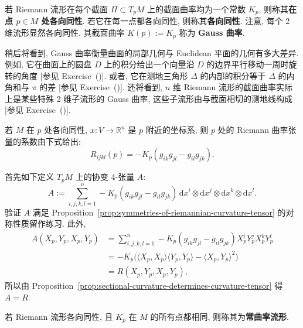 若 Riemann 流形在每个截面 $\Pi\subset T_pM$ 上的截面曲率均为一个常数 $K_p$, 则称其\textbf{在点 $p\in M$ 处各向同性}. 若它在每一点都各向同性, 则称其\textbf{各向同性}. 注意, 每个 2 维流形显然各向同性. 其截面曲率 $K(p):=K_p$ 称为 \textbf{Gauss 曲率}.

\begin{RiemannRemark}\label{rem:geometric-interpretations-of-gauss-curvature}
稍后将看到, Gauss 曲率衡量曲面的局部几何与 Euclidean 平面的几何有多大差异. 例如, 它在曲面上的圆盘 $D$ 上的积分给出一个向量沿 $D$ 的边界平行移动一周时旋转的角度 [参见 Exercise~()]. 或者, 它在测地三角形 $\Delta$ 的内部的积分等于 $\Delta$ 的内角和与 $\pi$ 的差 [参见 Exercise~()]. 还将看到, $n$ 维 Riemann 流形的截面曲率实际上是某些特殊 2 维子流形的 Gauss 曲率, 这些子流形由与截面相切的测地线构成 [参见 Exercise~()].
\end{RiemannRemark}

\begin{RiemannProposition}\label{prop:curvature-tensor-at-isotropic-point}
若 $M$ 在 $p$ 处各向同性, $x:V\to\mathbb{R}^n$ 是 $p$ 附近的坐标系, 则 $p$ 处的 Riemann 曲率张量的系数由下式给出:
\[
  R_{ijkl}(p)=-K_p(g_{ik}g_{jl}-g_{il}g_{jk}).
\]
\end{RiemannProposition}

\begin{RiemannProof}
首先如下定义 $T_pM$ 上的协变 4-张量 $A$:
\[
  A:=\sum_{i,j,k,l=1}^n-K_p(g_{ik}g_{jl}-g_{il}g_{jk})\,
    \mathrm{d}x^i\otimes\mathrm{d}x^j\otimes\mathrm{d}x^k\otimes\mathrm{d}x^l.
\]
验证 $A$ 满足 Proposition~\ref{prop:symmetries-of-riemannian-curvature-tensor} 的对称性质留作练习. 此外,
\begin{align*}
  A(X_p,Y_p,X_p,Y_p)
  &=\sum_{i,j,k,l=1}^n-K_p(g_{ik}g_{jl}-g_{il}g_{jk})X_p^iY_p^jX_p^kY_p^l\\
  &=-K_p\bigl(\langle X_p,X_p\rangle\langle Y_p,Y_p\rangle-\langle X_p,Y_p\rangle^2\bigr)\\
  &=R(X_p,Y_p,X_p,Y_p),
\end{align*}
所以由 Proposition~\ref{prop:sectional-curvature-determines-curvature-tensor} 得 $A=R$.
\end{RiemannProof}

\begin{RiemannDefinition}\label{def:manifold-of-constant-curvature}
若 Riemann 流形各向同性, 且 $K_p$ 在 $M$ 的所有点都相同, 则称其为\textbf{常曲率流形}.
\end{RiemannDefinition}

